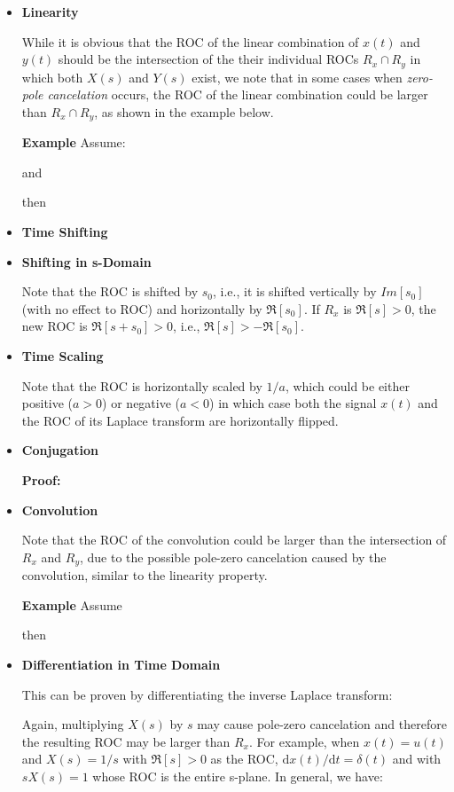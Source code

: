 	
	\begin{itemize}
	\item {\bf Linearity}
	
	While it is obvious that the ROC of the linear combination of $x(t)$ and $y(t)$ 
	should be the intersection of the their individual ROCs $R_x \cap R_y$ in which both
	$X(s)$ and $Y(s)$ exist, we note that in some cases when {\em zero-pole cancelation}
	occurs, the ROC of the linear combination could be larger than $R_x \cap R_y$, as 
	shown in the example below.
	
	{\bf Example } Assume:
	
	and
	
	then
	
	
	\item {\bf Time Shifting}
	
	
	\item {\bf Shifting in s-Domain}
	
	Note that the ROC is shifted by $s_0$, i.e., it is shifted vertically by $Im[s_0]$ 
	(with no effect to ROC) and horizontally by $\Re[s_0]$. If $R_x$ is $\Re[s]>0$, the
	new ROC is $\Re[s+s_0]>0$, i.e., $\Re[s]>-\Re[s_0]$.
	
	\item {\bf Time Scaling}
	
	Note that the ROC is horizontally scaled by $1/a$, which could be either positive
	($a>0$) or negative ($a<0$) in which case both the signal $x(t)$ and the ROC of
	its Laplace transform are horizontally flipped. 
	
	\item {\bf Conjugation}
	
	{\bf Proof: } 
	
	
	\item {\bf Convolution}
	
	Note that the ROC of the convolution could be larger than the intersection of $R_x$ and
	$R_y$, due to the possible pole-zero cancelation caused by the convolution, similar 
	to the linearity property.
	
	{\bf Example } Assume 
	
	then
	
	
	\item {\bf Differentiation in Time Domain}
	
	This can be proven by differentiating the inverse Laplace transform:
	
	Again, multiplying $X(s)$ by $s$ may cause pole-zero cancelation and therefore the
	resulting ROC may be larger than $R_x$. For example, when $x(t)=u(t)$ and $X(s)=1/s$ 
	with $\Re[s]>0$ as the ROC, $\mathrm{d} x(t)/\mathrm{d}t=\delta(t)$ and with $sX(s)=1$ whose ROC is the
	entire s-plane. In general, we have:
	

\end{itemize}
